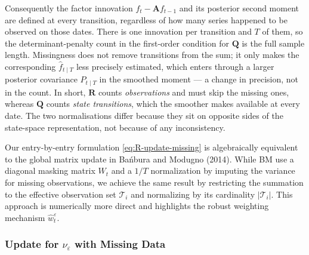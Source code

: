 \documentclass[11pt, a4paper, oneside]{article}
\begin{document}
Consequently the factor innovation $f_t - \mathbf{A} f_{t-1}$ and its
posterior second moment are defined at every transition, regardless
of how many series happened to be observed on those dates. There is
one innovation per transition and $T$ of them, so the
determinant-penalty count in the first-order condition for
$\mathbf{Q}$ is the full sample length. Missingness does not remove transitions from the sum; it only
makes the corresponding $\hat{f}_{t\mid T}$ less precisely estimated,
which enters through a larger posterior covariance $P_{t\mid T}$ in
the smoothed moment — a change in precision, not in the count. In
short, $\mathbf{R}$ counts \emph{observations} and must skip the
missing ones, whereas $\mathbf{Q}$ counts \emph{state transitions},
which the smoother makes available at every date. The two
normalisations differ because they sit on opposite sides of the
state-space representation, not because of any inconsistency.

Our entry-by-entry formulation \eqref{eq:R-update-missing} is algebraically equivalent to the global matrix update in Bańbura and Modugno (2014). While BM use a diagonal masking matrix $W_t$ and a $1/T$ normalization by imputing the variance for missing observations, we achieve the same result by restricting the summation to the effective observation set $\mathcal{T}_i$ and normalizing by its cardinality $|\mathcal{T}_i|$. This approach is numerically more direct and highlights the robust weighting mechanism $\hat{w}^\varepsilon_t$.

\subsubsection{Update for $\nu_\varepsilon$ with Missing Data}
\label{subsec:nu-eps-missing}
\end{document}
